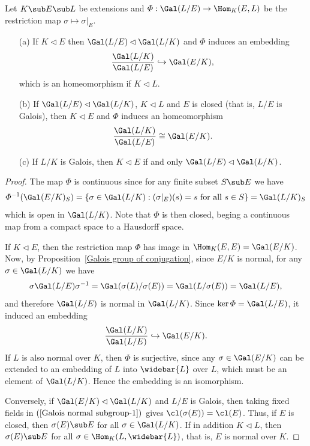 \begin{theorem}\label{Galois fundamental theorem-3}
Let $K\sub E\sub L$ be extensions and $\varPhi:\Gal(L/E)\to\Hom_K(E,L)$ be the restriction map $\sigma\mapsto\sigma|_E$.
\begin{itemize}
\item[(a)] If $K\lhd E$ then $\Gal(L/E)\lhd\Gal(L/K)$ and $\varPhi$ induces an embedding
\[\frac{\Gal(L/K)}{\Gal(L/E)}\hookrightarrow\Gal(E/K),\]
which is an homeomorphism if $K\lhd L$.
\item[(b)] If $\Gal(L/E)\lhd\Gal(L/K)$, $K\lhd L$ and $E$ is closed (that is, $L/E$ is Galois), then $K\lhd E$ and $\varPhi$ induces an homeomorphism
\[\frac{\Gal(L/K)}{\Gal(L/E)}\cong\Gal(E/K).\]
\item[(c)] If $L/K$ is Galois, then $K\lhd E$ if and only $\Gal(L/E)\lhd\Gal(L/K)$.
\end{itemize}
\end{theorem}
\begin{proof}
The map $\varPhi$ is continuous since for any finite subset $S\sub E$ we have
\[\varPhi^{-1}(\Gal(E/K)_{S})=\{\sigma\in\Gal(L/K):(\sigma|_E)(s)=s\text{ for all }s\in S\}=\Gal(L/K)_{S}\]
which is open in $\Gal(L/K)$. Note that $\varPhi$ is then closed, beging a continuous map from a compact space to a Hausdorff space.\par
If $K\lhd E$, then the restriction map $\varPhi$ has image in $\Hom_K(E,E)=\Gal(E/K)$. Now, by Proposition~\ref{Galois group of conjugation}, since $E/K$ is normal, for any $\sigma\in\Gal(L/K)$ we have
\begin{align}\label{Galois normal subgroup-1}
\sigma\Gal(L/E)\sigma^{-1}=\Gal(\sigma(L)/\sigma(E))=\Gal(L/\sigma(E))=\Gal(L/E),
\end{align}
and therefore $\Gal(L/E)$ is normal in $\Gal(L/K)$. Since $\ker\varPhi=\Gal(L/E)$, it induced an embedding
\[\frac{\Gal(L/K)}{\Gal(L/E)}\hookrightarrow\Gal(E/K).\]
If $L$ is also normal over $K$, then $\varPhi$ is surjective, since any $\sigma\in\Gal(E/K)$ can be extended to an embedding of $L$ into $\widebar{L}$ over $L$, which must be an element of $\Gal(L/K)$. Hence the embedding is an isomorphism.\par
Conversely, if $\Gal(E/K)\lhd\Gal(L/K)$ and $L/E$ is Galois, then taking fixed fields in $(\ref{Galois normal subgroup-1})$ gives $\cl(\sigma(E))=\cl(E)$. Thus, if $E$ is closed, then $\sigma(E)\sub E$ for all $\sigma\in\Gal(L/K)$. If in addition $K\lhd L$, then $\sigma(E)\sub E$ for all $\sigma\in\Hom_K(L,\widebar{L})$, that is, $E$ is normal over $K$.
\end{proof}
